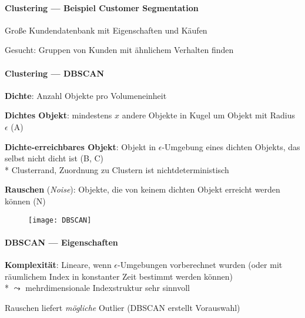 \paragraph{Clustering --- Beispiel Customer Segmentation}
\begin{items}
	\item Große Kundendatenbank mit Eigenschaften und Käufen
	\item Gesucht: Gruppen von Kunden mit ähnlichem Verhalten finden
\end{items}

\paragraph{Clustering --- DBSCAN}
\begin{items}
	\item \textbf{Dichte}: Anzahl Objekte pro Volumeneinheit
	\item \textbf{Dichtes Objekt}: mindestens \( x \) andere Objekte in Kugel um Objekt mit Radius \( \epsilon \) (A)
	\item \textbf{Dichte-erreichbares Objekt}: Objekt in \( \epsilon \)-Umgebung eines dichten Objekts, das selbst nicht dicht ist (B, C) \\*
		Clusterrand, Zuordnung zu Clustern ist nichtdeterministisch
	\item \textbf{Rauschen} (\emph{Noise}): Objekte, die von keinem dichten Objekt erreicht werden können (N)
\end{items}
\begin{figure}[H]\centering\label{DBSCAN}\texttt{[image: DBSCAN]}\end{figure}

\paragraph{DBSCAN --- Eigenschaften}
\begin{items}
	\item \textbf{Komplexität}: Lineare, wenn \( \epsilon \)-Umgebungen vorberechnet wurden (oder mit räumlichem Index in konstanter Zeit bestimmt werden können) \\* \( \leadsto \) mehrdimensionale Indexstruktur sehr sinnvoll
	\item Rauschen liefert \emph{mögliche} Outlier (DBSCAN erstellt Vorauswahl)
\end{items}

